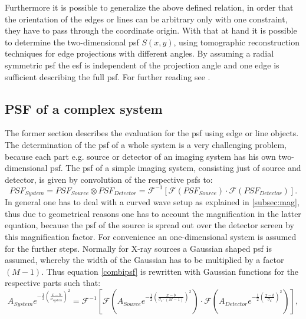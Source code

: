 Furthermore it is possible to generalize the above defined relation, in order that the orientation of the edges or lines can be arbitrary only with one constraint, they have to pass through the coordinate origin. With that at hand it is possible to determine the two-dimensional \gls{psf} $S(x,y)$, using tomographic reconstruction techniques for edge projections with different angles. By assuming a radial symmetric \acrlong{psf} the \acrfull{esf} is independent of the projection angle and one edge is sufficient describing the full \gls{psf}. For further reading see \citep{Donath2007}.
\subsection{PSF of a complex system} \label{subsec:complpsf}
The former section describes the evaluation for the \acrfull{psf} using edge or line objects. The determination of the \gls{psf} of a whole system is a very challenging problem, because each part e.g. source or detector of an imaging system has his own two-dimensional \gls{psf}. 
The \gls{psf} of a simple imaging system, consisting just of source and detector, is given by convolution of the respective \glspl{psf} to:
\begin{equation}\label{combipsf} 
PSF_{System} = PSF_{Source} \otimes PSF_{Detector} = \mathcal{F^{-1}}[\mathcal{F}(PSF_{Source})\cdot \mathcal{F}(PSF_{Detector})].
\end{equation}
In general one has to deal with a curved wave setup as explained in \ref{subsec:mag}, thus due to geometrical reasons one has to account the magnification in the latter equation, because the \gls{psf} of the source is spread out over the detector screen by this magnification factor. For convenience an one-dimensional system is assumed for the further steps. Normally for X-ray sources a Gaussian shaped \gls{psf} is assumed, whereby the width of the Gaussian has to be multiplied by a factor $(M-1)$. Thus equation \ref{combipsf} is rewritten with Gaussian functions for the respective parts such that:
\begin{equation}
A_{System}e^{-\frac{1}{2}(\frac{x -b}{\sigma_{system}})^{2}} = \mathcal{F^{-1}}[\mathcal{F}(A_{Source}e^{-\frac{1}{2}(\frac{x -b}{\sigma_{s}\cdot(M-1)})^{2}})
\cdot \mathcal{F}(A_{Detector}e^{-\frac{1}{2}(\frac{x -b}{\sigma_{d}})^{2}})],
\end{equation}
